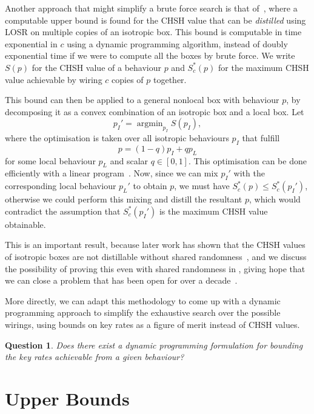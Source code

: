 \documentclass[10pt, a4paper]{article}
\numberwithin{equation}{section} %
\theoremstyle{definition}
\theoremstyle{plain}
\newtheorem{question}{Question}
\DeclareMathOperator*{\argmin}{argmin}
\newcommand{\ccintv}[2]{\left[#1,#2\right]}
\newcommand{\?}{\mathrel{?}} %
\begin{document}
      Another approach that might simplify a brute force search is that of~\cite{DistillationBounds}, where a computable upper bound is found for the CHSH value that can be \emph{distilled} using LOSR on multiple copies of an isotropic box. This bound is computable in time exponential in \(c\) using a dynamic programming algorithm, instead of doubly exponential time if we were to compute all the boxes by brute force. We write \(S(p)\) for the CHSH value of a behaviour \(p\) and \(S^*_c(p)\) for the maximum CHSH value achievable by wiring \(c\) copies of \(p\) together.

      This bound can then be applied to a general nonlocal box with behaviour \(p\), by decomposing it as a convex combination of an isotropic box and a local box. Let
      \[ p_I' = \argmin_{p_I} S(p_I), \]
      where the optimisation is taken over all isotropic behaviours \(p_I\) that fulfill
      \[ p = (1-q)p_I + qp_L \]
      for some local behaviour \(p_L\) and scalar \(q \in\ccintv{0}{1}\). This optimisation can be done efficiently with a linear program~\cite{LocalPartLP}. Now, since we can mix \(p_I'\) with the corresponding local behaviour \(p_L'\) to obtain \(p\), we must have \(S^*_c(p) \leq S^*_c(p_I')\), otherwise we could perform this mixing and distill the resultant \(p\), which would contradict the assumption that \(S^*_c(p_I')\) is the maximum CHSH value obtainable.

      This is an important result, because later work has shown that the CHSH values of isotropic boxes are not distillable without shared randomness~\cite{NLMonotones}, and we discuss the possibility of proving this even with shared randomness in , giving hope that we can close a problem that has been open for over a decade~\cite{NLLimits, DistillationBounds}.

      More directly, we can adapt this methodology to come up with a dynamic programming approach to simplify the exhaustive search over the possible wirings, using bounds on key rates as a figure of merit instead of CHSH values.

      \begin{question}
        Does there exist a dynamic programming formulation for bounding the key rates achievable from a given behaviour?
      \end{question}

      \section{Upper Bounds}\label{sec:ubound}
\end{document}
